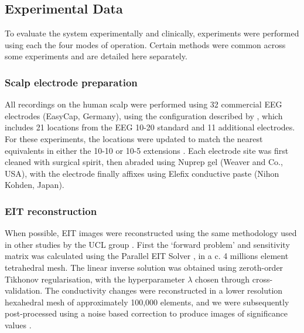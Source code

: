 \subsection{Experimental Data}

To evaluate the system experimentally and clinically, experiments were performed using each the four modes of operation. Certain methods were common across some experiments and are detailed here separately. 

\subsubsection{Scalp electrode preparation}
All recordings on the human scalp were performed using 32 commercial EEG electrodes (EasyCap, Germany), using the configuration described by \citet{tidswell2001three}, which includes 21 locations from the EEG 10-20 standard \cite{Jasper1958} and 11 additional electrodes. For these experiments, the locations were updated to match the nearest equivalents in either the 10-10 or 10-5 extensions \cite{Oostenveld2001}. Each electrode site was first cleaned with surgical spirit, then abraded using Nuprep gel (Weaver and Co., USA), with the electrode finally affixes using Elefix conductive paste (Nihon Kohden, Japan). 

\subsubsection{EIT reconstruction}
When possible, EIT images were reconstructed using the same methodology used in other studies by the UCL group \cite{Dowrick_2016,Aristovich_2016,Aristovich_2014}. First the `forward problem' and sensitivity matrix was calculated using the Parallel EIT Solver \cite{Jehl2014}, in a c. 4 millions element tetrahedral mesh. The linear inverse solution was obtained using zeroth-order Tikhonov regularisation, with the hyperparameter $\lambda$ chosen through cross-validation.  The conductivity changes were reconstructed in a lower resolution hexahedral mesh of approximately 100,000 elements, and we were subsequently post-processed using a noise based correction to produce images of significance values \cite{Aristovich_2016}.